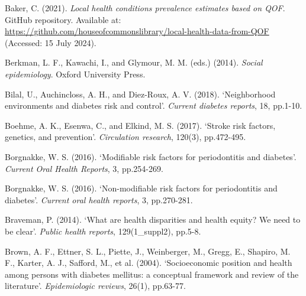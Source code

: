 \begin{Reference}
\begin{flushleft}
Baker, C. (2021). \textit{Local health conditions prevalence estimates based on QOF}. GitHub repository. Available at: \url{https://github.com/houseofcommonslibrary/local-health-data-from-QOF} (Accessed: 15 July 2024).
\end{flushleft}
\vspace{7pt}


\begin{flushleft}
Berkman, L. F., Kawachi, I., and Glymour, M. M. (eds.) (2014). \textit{Social epidemiology}. Oxford University Press.
\end{flushleft}
\vspace{2pt}


\begin{flushleft}
Bilal, U., Auchincloss, A. H., and Diez-Roux, A. V. (2018). `Neighborhood environments and diabetes risk and control'. \textit{Current diabetes reports}, 18, pp.1-10.
\end{flushleft}
\vspace{2pt}


\begin{flushleft}
Boehme, A. K., Esenwa, C., and Elkind, M. S. (2017). `Stroke risk factors, genetics, and prevention'. \textit{Circulation research}, 120(3), pp.472-495.
\end{flushleft}
\vspace{2pt}


\begin{flushleft}
Borgnakke, W. S. (2016). `Modifiable risk factors for periodontitis and diabetes'. \textit{Current Oral Health Reports}, 3, pp.254-269.
\end{flushleft}
\vspace{2pt}


\begin{flushleft}
Borgnakke, W. S. (2016). `Non-modifiable risk factors for periodontitis and diabetes'. \textit{Current oral health reports}, 3, pp.270-281.
\end{flushleft}
\vspace{2pt}


\begin{flushleft}
Braveman, P. (2014). `What are health disparities and health equity? We need to be clear'. \textit{Public health reports}, 129(1\_suppl2), pp.5-8.
\end{flushleft}
\vspace{2pt}


\begin{flushleft}
Brown, A. F., Ettner, S. L., Piette, J., Weinberger, M., Gregg, E., Shapiro, M. F., Karter, A. J., Safford, M., et al. (2004). `Socioeconomic position and health among persons with diabetes mellitus: a conceptual framework and review of the literature'. \textit{Epidemiologic reviews}, 26(1), pp.63-77.
\end{flushleft}
\vspace{2pt}



\end{Reference}
